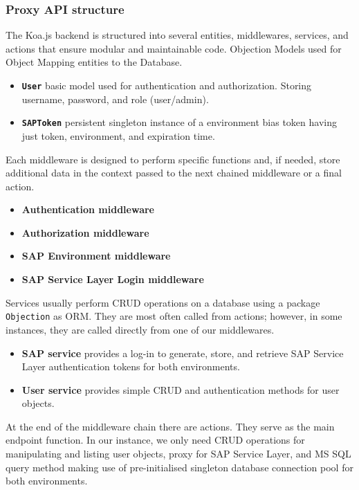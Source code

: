 \subsubsection{Proxy API structure}
The Koa.js backend is structured into several entities, middlewares, services, and actions that ensure modular and maintainable code. 
Objection Models used for Object Mapping entities to the Database.
\begin{itemize}
    \item \textbf{\texttt{User}} basic model used for authentication and authorization. Storing username, password, and role (user/admin).
    \item \textbf{\texttt{SAPToken}} persistent singleton instance of a environment bias token having just token, environment, and expiration time.
\end{itemize}
Each middleware is designed to perform specific functions and, if needed, store additional data in the context passed to the next chained middleware or a final action.
\begin{itemize}
    \item \textbf{Authentication middleware}
    \item \textbf{Authorization middleware}
    \item \textbf{SAP Environment middleware}
    \item \textbf{SAP Service Layer Login middleware}
\end{itemize}
Services usually perform CRUD operations on a database using a package \texttt{Objection} as ORM. They are most often called from actions; however, in some instances, they are called directly from one of our middlewares.
\begin{itemize}
    \item \textbf{SAP service} provides a log-in to generate, store, and retrieve SAP Service Layer authentication tokens for both environments.
    \item \textbf{User service} provides simple CRUD and authentication methods for user objects.
\end{itemize}
At the end of the middleware chain there are actions.
They serve as the main endpoint function.
In our instance, we only need CRUD operations for manipulating and listing user objects, proxy for SAP Service Layer, and MS SQL query method making use of pre-initialised singleton database connection pool for both environments.
